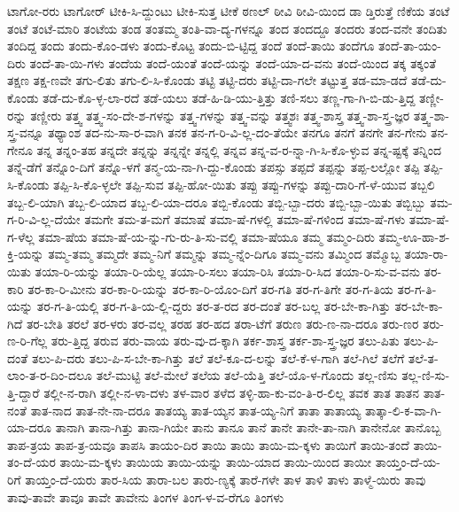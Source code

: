 {ಟಾಗೋ-ರರು
ಟಾಗೋರ್
ಟೀಕಿ-ಸಿ-ದ್ದುಂಟು
ಟೀಕಿ-ಸುತ್ತ
ಟೀಕೆ
ಠಣಲ್
ಠೀವಿ
ಠೀವಿ-ಯಿಂದ
ಡಾ
ಡ್ತಿರುತ್ತೆ
ಣಿಕೆಯ
ತಂಟೆ
ತಂಟೆ
ತಂಟೆ-ಮಾರಿ
ತಂಟೆಯ
ತಂಡ
ತಂತಮ್ಮ
ತಂತಿ-ವಾ-ದ್ಯ-ಗಳನ್ನೂ
ತಂದ
ತಂದದ್ದೂ
ತಂದರು
ತಂದ-ವನೇ
ತಂದಿತು
ತಂದಿದ್ದ
ತಂದು
ತಂದು-ಕೊಂ-ಡಳು
ತಂದು-ಕೊಟ್ಟ
ತಂದು-ಬಿ-ಟ್ಟಿದ್ದ
ತಂದೆ
ತಂದೆ-ತಾಯಿ
ತಂದೆಗೂ
ತಂದೆ-ತಾ-ಯಂ-ದಿರು
ತಂದೆ-ತಾ-ಯಿ-ಗಳು
ತಂದೆಯ
ತಂದೆ-ಯಂತೆ
ತಂದೆ-ಯನ್ನು
ತಂದೆ-ಯಾ-ದ-ವನು
ತಂದೆ-ಯಿಂದ
ತಕ್ಕ
ತಕ್ಕಂತೆ
ತಕ್ಷಣ
ತಕ್ಷ-ಣವೇ
ತಗು-ಲಿತು
ತಗು-ಲಿ-ಸಿ-ಕೊಂಡು
ತಟ್ಟಿ
ತಟ್ಟಿ-ದರು
ತಟ್ಟಿ-ದಾ-ಗಲೇ
ತಟ್ಟುತ್ತ
ತಡ-ಮಾ-ಡದೆ
ತಡೆ-ದು-ಕೊಂಡು
ತಡೆ-ದು-ಕೊ-ಳ್ಳ-ಲಾ-ರದೆ
ತಡೆ-ಯಲು
ತಡೆ-ಹಿ-ಡಿ-ಯು-ತ್ತಿತ್ತು
ತಣಿ-ಸಲು
ತಣ್ಣ-ಗಾ-ಗಿ-ಬಿ-ಡು-ತ್ತಿದ್ದ
ತಣ್ಣೀ-ರನ್ನು
ತಣ್ಣೀರು
ತತ್ತ್ವ
ತತ್ತ್ವ-ಸಂ-ದೇ-ಶ-ಗಳನ್ನು
ತತ್ತ್ವ-ಗಳನ್ನು
ತತ್ತ್ವ-ವನ್ನು
ತತ್ತ್ವಶಃ
ತತ್ತ್ವ-ಶಾಸ್ತ್ರ
ತತ್ತ್ವ-ಶಾ-ಸ್ತ್ರ-ಜ್ಞರ
ತತ್ತ್ವ-ಶಾ-ಸ್ತ್ರ-ವನ್ನೂ
ತಥ್ಯಾಂಶ
ತದ-ನು-ಸಾ-ರ-ವಾಗಿ
ತನಕ
ತನ-ಗ-ರಿ-ವಿ-ಲ್ಲ-ದಂ-ತೆಯೇ
ತನಗೂ
ತನಗೆ
ತನಗೇ
ತನ-ಗೇನು
ತನ-ಗೇನೂ
ತನ್ನ
ತನ್ನಂ-ತಹ
ತನ್ನದೇ
ತನ್ನನ್ನು
ತನ್ನನ್ನೇ
ತನ್ನಲ್ಲಿ
ತನ್ನವ
ತನ್ನ-ವ-ರ-ನ್ನಾ-ಗಿ-ಸಿ-ಕೊ-ಳ್ಳುವ
ತನ್ನ-ಷ್ಟಕ್ಕೆ
ತನ್ನಿಂದ
ತನ್ನೆ-ಡೆಗೆ
ತನ್ನೊಂ-ದಿಗೆ
ತನ್ನೊ-ಳಗೆ
ತನ್ಮ-ಯ-ನಾ-ಗಿ-ದ್ದು-ಕೊಂಡು
ತಪಸ್ಸು
ತಪ್ಪದೆ
ತಪ್ಪನ್ನು
ತಪ್ಪ-ಲಲ್ಲೋ
ತಪ್ಪಿ
ತಪ್ಪಿ-ಸಿ-ಕೊಂಡು
ತಪ್ಪಿ-ಸಿ-ಕೊ-ಳ್ಳಲೇ
ತಪ್ಪಿ-ಸುವ
ತಪ್ಪಿ-ಹೋ-ಯಿತು
ತಪ್ಪು
ತಪ್ಪು-ಗಳನ್ನು
ತಪ್ಪು-ದಾರಿ-ಗೆ-ಳೆ-ಯುವ
ತಬ್ಬಲಿ
ತಬ್ಬ-ಲಿ-ಯಾಗಿ
ತಬ್ಬ-ಲಿ-ಯಾದ
ತಬ್ಬ-ಲಿ-ಯಾ-ದರೂ
ತಬ್ಬಿ-ಕೊಂಡು
ತಬ್ಬಿ-ಬ್ಬಾ-ದರು
ತಬ್ಬಿ-ಬ್ಬಾ-ಯಿತು
ತಬ್ಬಿಬ್ಬು
ತಮ-ಗ-ರಿ-ವಿ-ಲ್ಲ-ದೆಯೇ
ತಮಗೇ
ತಮ-ತ-ಮಗೆ
ತಮಾಷೆ
ತಮಾ-ಷೆ-ಗಳಲ್ಲಿ
ತಮಾ-ಷೆ-ಗಳಿಂದ
ತಮಾ-ಷೆ-ಗಳು
ತಮಾ-ಷೆ-ಗ-ಳೆಲ್ಲ
ತಮಾ-ಷೆಯ
ತಮಾ-ಷೆ-ಯ-ನ್ನು-ಗು-ರು-ತಿ-ಸು-ವಲ್ಲಿ
ತಮಾ-ಷೆಯೂ
ತಮ್ಮ
ತಮ್ಮಂ-ದಿರು
ತಮ್ಮ-ಊ-ಹಾ-ಶ-ಕ್ತಿ-ಯನ್ನು
ತಮ್ಮ-ತಮ್ಮ
ತಮ್ಮದೇ
ತಮ್ಮ-ನಿಗೆ
ತಮ್ಮನ್ನು
ತಮ್ಮ-ನ್ನೆಂ-ದಿಗೂ
ತಮ್ಮ-ವನು
ತಮ್ಮಿಂದ
ತಮ್ಮೊಬ್ಬ
ತಯಾ-ರಾ-ಯಿತು
ತಯಾ-ರಿ-ಯನ್ನು
ತಯಾ-ರಿ-ಯೆಲ್ಲ
ತಯಾ-ರಿ-ಸಲು
ತಯಾ-ರಿಸಿ
ತಯಾ-ರಿ-ಸಿದ
ತಯಾ-ರಿ-ಸು-ವ-ವನು
ತರ-ಕಾರಿ
ತರ-ಕಾ-ರಿ-ಮೀನು
ತರ-ಕಾ-ರಿ-ಯನ್ನು
ತರ-ಕಾ-ರಿ-ಯೊಂ-ದಿಗೆ
ತರ-ಗತಿ
ತರ-ಗ-ತಿಗೇ
ತರ-ಗ-ತಿಯ
ತರ-ಗ-ತಿ-ಯನ್ನು
ತರ-ಗ-ತಿ-ಯಲ್ಲಿ
ತರ-ಗ-ತಿ-ಯ-ಲ್ಲಿ-ದ್ದರು
ತರ-ತ-ರದ
ತರ-ದಂತೆ
ತರ-ಬಲ್ಲ
ತರ-ಬೇ-ಕಾ-ಗಿತ್ತು
ತರ-ಬೇ-ಕಾ-ಗಿದೆ
ತರ-ಬೇತಿ
ತರಲೆ
ತರ-ಳರು
ತರ-ವಲ್ಲ
ತರಹ
ತರ-ಹದ
ತರಾ-ಟೆಗೆ
ತರುಣ
ತರು-ಣ-ನಾ-ದರೂ
ತರು-ಣರ
ತರು-ಣ-ರಿ-ಗೆಲ್ಲ
ತರು-ತ್ತಿದ್ದ
ತರುವ
ತರು-ವಾಯ
ತರು-ವು-ದ-ಕ್ಕಾಗಿ
ತರ್ಕ-ಶಾಸ್ತ್ರ
ತರ್ಕ-ಶಾ-ಸ್ತ್ರ-ಜ್ಞರ
ತಲು-ಪಿತು
ತಲು-ಪಿ-ದಂತೆ
ತಲು-ಪಿ-ದರು
ತಲು-ಪಿ-ಸ-ಬೇ-ಕಾ-ಗಿತ್ತು
ತಲೆ
ತಲೆ-ಕೂ-ದ-ಲನ್ನು
ತಲೆ-ಕೆ-ಳ-ಗಾಗಿ
ತಲೆ-ಗಿಲೆ
ತಲೆಗೆ
ತಲೆ-ತ-ಲಾಂ-ತ-ರ-ದಿಂ-ದಲೂ
ತಲೆ-ಮುಟ್ಟಿ
ತಲೆ-ಮೇಲೆ
ತಲೆಯ
ತಲೆ-ಯೆತ್ತಿ
ತಲೆ-ಯೊ-ಳ-ಗೊಂದು
ತಲ್ಲ-ಣಿಸು
ತಲ್ಲ-ಣಿ-ಸು-ತ್ತಿ-ದ್ದಾರೆ
ತಲ್ಲೀ-ನ-ರಾಗಿ
ತಲ್ಲೀ-ನ-ಳಾ-ದಳು
ತಳ-ವಾರ
ತಳೆದ
ತಳ್ಳಿ-ಹಾ-ಕು-ವಂ-ತಿ-ರ-ಲಿಲ್ಲ
ತವಕ
ತಾತ
ತಾತನ
ತಾತ-ನಂತೆ
ತಾತ-ನಾದ
ತಾತ-ನೇ-ನಾ-ದರೂ
ತಾತಯ್ಯ
ತಾತ-ಯ್ಯನ
ತಾತ-ಯ್ಯ-ನಿಗೆ
ತಾತಾ
ತಾತಾಯ್ಯ
ತಾತ್ಕಾ-ಲಿ-ಕ-ವಾ-ಗಿ-ಯಾ-ದರೂ
ತಾನಾಗಿ
ತಾನಾ-ಗಿತ್ತು
ತಾನಾ-ಗಿಯೇ
ತಾನು
ತಾನೂ
ತಾನೆ
ತಾನೇ
ತಾನೇ-ತಾ-ನಾಗಿ
ತಾನೇನೋ
ತಾನೊಬ್ಬ
ತಾಪ-ತ್ರಯ
ತಾಪ-ತ್ರ-ಯವೂ
ತಾಪಸಿ
ತಾಯಂ-ದಿರ
ತಾಯಿ
ತಾಯಿ
ತಾಯಿ-ಮ-ಕ್ಕಳು
ತಾಯಿಗೆ
ತಾಯಿ-ತಂದೆ
ತಾಯಿ-ತಂ-ದೆ-ಯರ
ತಾಯಿ-ಮ-ಕ್ಕಳು
ತಾಯಿಯ
ತಾಯಿ-ಯನ್ನು
ತಾಯಿ-ಯಾದ
ತಾಯಿ-ಯಿಂದ
ತಾಯೀ
ತಾಯ್ತಂ-ದೆ-ಯ-ರಿಗೆ
ತಾಯ್ತಂ-ದೆ-ಯರು
ತಾರ-ಸಿಯ
ತಾರಾ-ಬಲ
ತಾರು-ಣ್ಯಕ್ಕೆ
ತಾರೆ-ಗಳೇ
ತಾಳ
ತಾಳಿ
ತಾಳು
ತಾಳ್ಮೆ-ಯಿರು
ತಾವು
ತಾವು-ತಾವೇ
ತಾವೂ
ತಾವೇ
ತಾವೇನು
ತಿಂಗಳ
ತಿಂಗ-ಳ-ವ-ರೆಗೂ
ತಿಂಗಳು
}
